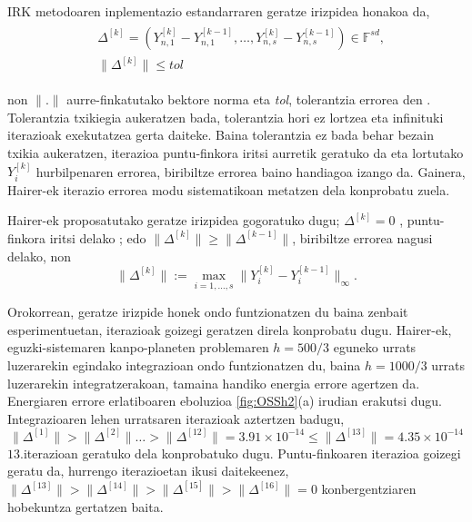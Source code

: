 IRK metodoaren inplementazio estandarraren geratze irizpidea honakoa da,
\begin{align}
\begin{split}
&\Delta^{[k]}=(Y_{n,1}^{[k]}-Y_{n,1}^{[k-1]},\dots,Y_{n,s}^{[k]}-Y_{n,s}^{[k-1]}) \in \mathbb{F}^{sd},\\
&\|\Delta^{[k]}\| \leqslant tol
\end{split}
\end{align} 

non $\|.\|$ aurre-finkatutako bektore norma eta \emph{tol}, tolerantzia errorea den . Tolerantzia txikiegia aukeratzen bada, tolerantzia hori ez lortzea eta infinituki iterazioak exekutatzea gerta daiteke. Baina tolerantzia ez bada behar bezain txikia aukeratzen, iterazioa puntu-finkora iritsi aurretik geratuko da eta lortutako $Y_i^{[k]}$ hurbilpenaren errorea, biribiltze errorea baino  handiagoa izango da. Gainera, Hairer-ek \cite{Hairer2008} iterazio errorea modu sistematikoan metatzen dela konprobatu zuela.   

Hairer-ek proposatutako geratze irizpidea gogoratuko dugu; $\Delta^{[k]} = 0$ , puntu-finkora iritsi delako ;  edo   $\|\Delta^{[k]}\| \geqslant \|\Delta^{[k-1]}\|$, biribiltze errorea nagusi delako,
non
\begin{equation*}
\|\Delta^{[k]}\|:= \max_{i=1,\dots,s} \|Y_i^{[k]}-Y_i^{[k-1]}\|_{\infty}.
\end{equation*}


Orokorrean, geratze irizpide honek ondo funtzionatzen du baina zenbait esperimentuetan, iterazioak goizegi geratzen direla konprobatu dugu. Hairer-ek, eguzki-sistemaren kanpo-planeten problemaren $h=500/3$ eguneko urrats luzerarekin egindako integrazioan ondo funtzionatzen du, baina $h=1000/3$ urrats luzerarekin integratzerakoan, tamaina handiko energia errore agertzen da. Energiaren errore erlatiboaren eboluzioa \ref{fig:OSSh2}(a) irudian erakutsi dugu. Integrazioaren lehen urratsaren iterazioak aztertzen badugu,
\begin{equation*}
\|\Delta^{[1]}\|>\|\Delta^{[2]}\| \dots > \|\Delta^{[12]}\|=3.91\times 10^{-14} \leqslant \|\Delta^{[13]}\|=4.35 \times 10^{-14} 
\end{equation*} 
$13.$iterazioan geratuko dela konprobatuko dugu. Puntu-finkoaren iterazioa goizegi geratu da, hurrengo iterazioetan ikusi daitekeenez, $\|\Delta^{[13]}\|>\|\Delta^{[14]}\|>\|\Delta^{[15]}\|>\|\Delta^{[16]}\|=0$ konbergentziaren hobekuntza gertatzen baita. 

